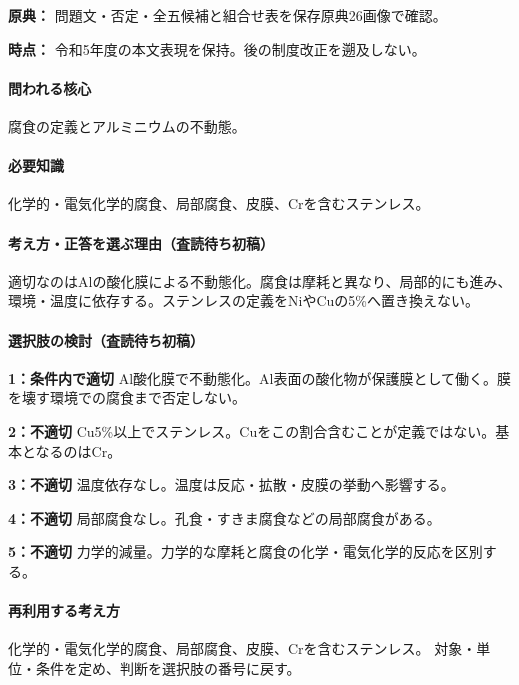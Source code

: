 \noindent\textbf{原典：} 問題文・否定・全五候補と組合せ表を保存原典26画像で確認。\par

\noindent\textbf{時点：} 令和5年度の本文表現を保持。後の制度改正を遡及しない。\par

\paragraph{問われる核心} 腐食の定義とアルミニウムの不動態。

\paragraph{必要知識} 化学的・電気化学的腐食、局部腐食、皮膜、Crを含むステンレス。

\paragraph{考え方・正答を選ぶ理由（査読待ち初稿）} 適切なのはAlの酸化膜による不動態化。腐食は摩耗と異なり、局部的にも進み、環境・温度に依存する。ステンレスの定義をNiやCuの5\%へ置き換えない。

\paragraph{選択肢の検討（査読待ち初稿）}\mbox{}\par

\noindent\textbf{1：条件内で適切} Al酸化膜で不動態化。Al表面の酸化物が保護膜として働く。膜を壊す環境での腐食まで否定しない。\par

\noindent\textbf{2：不適切} Cu5\%以上でステンレス。Cuをこの割合含むことが定義ではない。基本となるのはCr。\par

\noindent\textbf{3：不適切} 温度依存なし。温度は反応・拡散・皮膜の挙動へ影響する。\par

\noindent\textbf{4：不適切} 局部腐食なし。孔食・すきま腐食などの局部腐食がある。\par

\noindent\textbf{5：不適切} 力学的減量。力学的な摩耗と腐食の化学・電気化学的反応を区別する。\par

\paragraph{再利用する考え方} 化学的・電気化学的腐食、局部腐食、皮膜、Crを含むステンレス。 対象・単位・条件を定め、判断を選択肢の番号に戻す。

